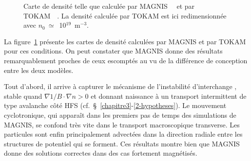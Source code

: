 \begin{refsection}
\begin{figure}[!htbp]
  \centering
    \caption{Carte de densité telle que calculée par MAGNIS~~
et par TOKAM~~. La densité calculée par TOKAM est ici
redimensionnée avec $n_0~\simeq$~10$^{19}$~m$^{-3}$.}
    \label{4-TokamDensite}
\end{figure}


La figure~\ref{4-TokamDensite} présente les cartes de densité
calculées par MAGNIS et par TOKAM pour ces conditions. On peut
constater que MAGNIS donne des résultats remarquablement proches de ceux
escomptés au vu de la différence de conception entre les deux modèles. 

Tout d'abord, il arrive à capturer le mécanisme de l'instabilité d'interchange ,
stable quand $\nabla 1/B\cdot\nabla n>0$ et donnant naissance à un transport intermittent de
type avalanche côté HFS (cf.~\S~\ref{chapitre3}-\ref{2-hypotheses}). Le
mouvement cyclotronique, qui apparaît dans les premiers pas de temps des
simulations de MAGNIS, se confond très vite dans le transport macroscopique
transverse. Les particules sont enfin principalement advectées dans la
direction radiale entre les structures de potentiel qui se forment. Ces
résultats montre bien que MAGNIS donne des solutions correctes dans
des cas fortement magnétisés.


\end{refsection}
